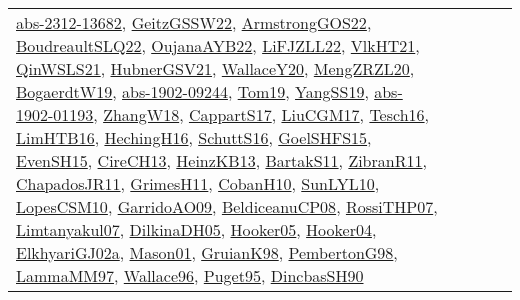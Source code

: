 {\begin{longtable}{lp{3cm}>{\raggedright}p{6cm}>{\raggedright}p{6cm}p{8cm}}
\href{articles/abs-2312-13682.pdf}{abs-2312-13682}\cite{abs-2312-13682}, \href{papers/GeitzGSSW22.pdf}{GeitzGSSW22}\cite{GeitzGSSW22}, \href{papers/ArmstrongGOS22.pdf}{ArmstrongGOS22}\cite{ArmstrongGOS22}, \href{papers/BoudreaultSLQ22.pdf}{BoudreaultSLQ22}\cite{BoudreaultSLQ22}, \href{papers/OujanaAYB22.pdf}{OujanaAYB22}\cite{OujanaAYB22}, \href{papers/LiFJZLL22.pdf}{LiFJZLL22}\cite{LiFJZLL22}, \href{articles/VlkHT21.pdf}{VlkHT21}\cite{VlkHT21}, \href{articles/QinWSLS21.pdf}{QinWSLS21}\cite{QinWSLS21}, \href{articles/HubnerGSV21.pdf}{HubnerGSV21}\cite{HubnerGSV21}, \href{articles/WallaceY20.pdf}{WallaceY20}\cite{WallaceY20}, \href{articles/MengZRZL20.pdf}{MengZRZL20}\cite{MengZRZL20}, \href{papers/BogaerdtW19.pdf}{BogaerdtW19}\cite{BogaerdtW19}, \href{articles/abs-1902-09244.pdf}{abs-1902-09244}\cite{abs-1902-09244}, \href{papers/Tom19.pdf}{Tom19}\cite{Tom19}, \href{papers/YangSS19.pdf}{YangSS19}\cite{YangSS19}, \href{articles/abs-1902-01193.pdf}{abs-1902-01193}\cite{abs-1902-01193}, \href{articles/ZhangW18.pdf}{ZhangW18}\cite{ZhangW18}, \href{papers/CappartS17.pdf}{CappartS17}\cite{CappartS17}, \href{papers/LiuCGM17.pdf}{LiuCGM17}\cite{LiuCGM17}, \href{papers/Tesch16.pdf}{Tesch16}\cite{Tesch16}, \href{papers/LimHTB16.pdf}{LimHTB16}\cite{LimHTB16}, \href{papers/HechingH16.pdf}{HechingH16}\cite{HechingH16}, \href{papers/SchuttS16.pdf}{SchuttS16}\cite{SchuttS16}, \href{articles/GoelSHFS15.pdf}{GoelSHFS15}\cite{GoelSHFS15}, \href{papers/EvenSH15.pdf}{EvenSH15}\cite{EvenSH15}, \href{papers/CireCH13.pdf}{CireCH13}\cite{CireCH13}, \href{papers/HeinzKB13.pdf}{HeinzKB13}\cite{HeinzKB13}, \href{articles/BartakS11.pdf}{BartakS11}\cite{BartakS11}, \href{papers/ZibranR11.pdf}{ZibranR11}\cite{ZibranR11}, \href{papers/ChapadosJR11.pdf}{ChapadosJR11}\cite{ChapadosJR11}, \href{papers/GrimesH11.pdf}{GrimesH11}\cite{GrimesH11}, \href{papers/CobanH10.pdf}{CobanH10}\cite{CobanH10}, \href{papers/SunLYL10.pdf}{SunLYL10}\cite{SunLYL10}, \href{articles/LopesCSM10.pdf}{LopesCSM10}\cite{LopesCSM10}, \href{articles/GarridoAO09.pdf}{GarridoAO09}\cite{GarridoAO09}, \href{papers/BeldiceanuCP08.pdf}{BeldiceanuCP08}\cite{BeldiceanuCP08}, \href{papers/RossiTHP07.pdf}{RossiTHP07}\cite{RossiTHP07}, \href{papers/Limtanyakul07.pdf}{Limtanyakul07}\cite{Limtanyakul07}, \href{papers/DilkinaDH05.pdf}{DilkinaDH05}\cite{DilkinaDH05}, \href{articles/Hooker05.pdf}{Hooker05}\cite{Hooker05}, \href{papers/Hooker04.pdf}{Hooker04}\cite{Hooker04}, \href{papers/ElkhyariGJ02a.pdf}{ElkhyariGJ02a}\cite{ElkhyariGJ02a}, \href{articles/Mason01.pdf}{Mason01}\cite{Mason01}, \href{papers/GruianK98.pdf}{GruianK98}\cite{GruianK98}, \href{papers/PembertonG98.pdf}{PembertonG98}\cite{PembertonG98}, \href{articles/LammaMM97.pdf}{LammaMM97}\cite{LammaMM97}, \href{articles/Wallace96.pdf}{Wallace96}\cite{Wallace96}, \href{papers/Puget95.pdf}{Puget95}\cite{Puget95}, \href{articles/DincbasSH90.pdf}{DincbasSH90}\cite{DincbasSH90}\\

\end{longtable}}
